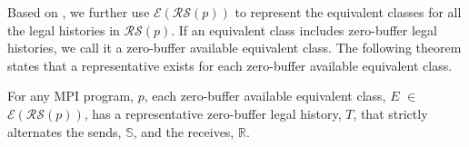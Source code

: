 Based on , we further use $\mathcal{E}$$(\mathcal{RS}(\mathit{p}))$ to represent the equivalent classes for all the legal histories in $\mathcal{RS}(\mathit{p})$. If an equivalent class includes zero-buffer legal histories, we call it a zero-buffer available equivalent class. The following theorem states that a representative exists for each zero-buffer available equivalent class.


\begin{theorem}
For any MPI program, $\mathit{p}$, each zero-buffer available equivalent class, $\mathit{E}$ $\in$ $\mathcal{E}(\mathcal{RS}(\mathit{p}))$, has a representative zero-buffer legal history, $T$, that strictly alternates the sends, $\mathbb{S}$, and the receives, $\mathbb{R}$.
\end{theorem}

